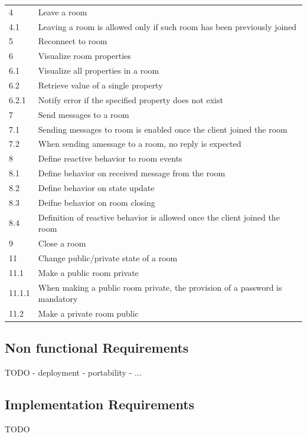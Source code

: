 \begin{center}
\begin{longtable}{|l|l|}
4       & Leave a room \\
4.1     & Leaving a room is allowed only if such room has been previously joined \\
5       & Reconnect to room \\
6       & Visualize room properties \\
6.1     & Visualize all properties in a room \\
6.2     & Retrieve value of a single property \\
6.2.1   & Notify error if the specified property does not exist \\
7       & Send messages to a room \\
7.1     & Sending messages to room is enabled once the client joined the room \\
7.2     & When sending amessage to a room, no reply is expected \\
8       & Define reactive behavior to room events \\
8.1     & Define behavior on received message from the room \\
8.2     & Define behavior on state update \\
8.3     & Deifne behavior on room closing \\
8.4     & Definition of reactive behavior is allowed once the client joined the room \\
9       & Close a room \\
11      & Change public/private state of a room \\
11.1    & Make a public room private \\
11.1.1  & When making a public room private, the provision of a password is mandatory \\ 
11.2    & Make a private room public \\
\hline

  \end{longtable}
\end{center}


\subsection{Non functional Requirements} 

TODO
- deployment 
- portability 
- ...
 
\subsection{Implementation Requirements}
 
TODO 
 
 

 